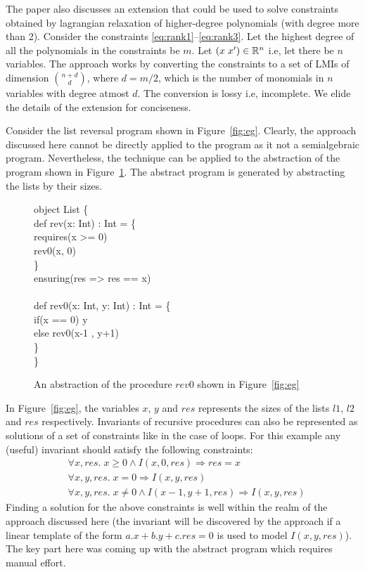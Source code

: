 The paper also discusses an extension that could be used to solve constraints obtained by lagrangian relaxation of higher-degree polynomials (with degree more than 2). Consider the constraints \ref{eq:rank1}--\ref{eq:rank3}. Let the highest degree of all the polynomials in the constraints be $m$. Let $(x \; x') \in \mathbb{R}^n$ i.e, let there be $n$ variables. The approach works by converting the constraints to a set of LMIs of dimension ${ n+ d \choose d}$, where $d = m/2$, which is the number of monomials in $n$ variables with degree atmost $d$. The conversion is lossy i.e, incomplete. We elide the details of the extension for conciseness.

Consider the list reversal program shown in Figure~\ref{fig:eg}. Clearly, the approach discussed here cannot be directly applied to the program as it not a semialgebraic program. Nevertheless, the technique can be applied to the abstraction of the program shown in Figure~\ref{fig:absRev}. The abstract program is generated
by abstracting the lists by their sizes. 
%
\begin{figure}
\begin{myprogram}
object List \{ \\
\pnl \>    def rev(x: Int) : Int = \{ \\
\pnl \> 	requires(x >= 0) \\
\pnl \> \>      rev0(x, 0)  \\
\pnl \>    \} \\
\pnl \>    ensuring(res => res == x)\\
\\    
\pnl \>    def rev0(x: Int, y: Int) : Int = \{ \\
\pnl \> \>      if(x == 0) y  \\
\pnl \> \>      else rev0(x-1 , y+1) \\
\pnl \>    \} \\ 
\}
\end{myprogram}
\caption{An abstraction of the procedure $rev0$ shown in Figure~\ref{fig:eg}} \label{fig:absRev}
\end{figure}
%
In Figure~\ref{fig:eg}, the variables $x$, $y$ and $res$ represents the 
sizes of the lists $l1$, $l2$ and $res$ respectively.
Invariants of recursive procedures can also be represented as solutions 
of a set of constraints like in the case of loops.
For this example any (useful) invariant should satisfy the following constraints:
%
\begin{align}
& \forall x,res. \; x \ge 0 \wedge I(x,0,res) \Rightarrow res = x \\
& \forall x,y,res. \; x = 0 \Rightarrow I(x,y,res) \\
& \forall x,y,res. \; x \ne 0 \wedge I(x-1,y+1,res) \Rightarrow I(x,y,res)
\end{align}
%
Finding a solution for the above constraints is well within the realm of the approach discussed here (the invariant will be discovered by the approach if a linear template of the form $a.x+b.y+c.res = 0$ is used to model $I(x,y,res)$). The key part here was coming up with the abstract program which requires manual effort.


